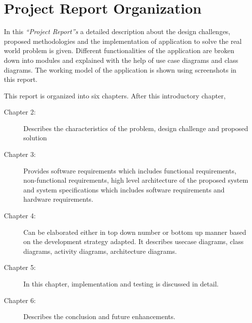 \documentclass[../Report.tex]{subfiles}
\begin{document}
\section{Project Report Organization}

In this \textit{``Project Report''s} a detailed description about the design challenges, proposed methodologies and the implementation of 
application to solve the real world problem is given. Different functionalities of the application are broken down into modules and 
explained with the help of use case diagrams and class diagrams. The working model of the application is shown using screenshots in this 
report.\par

\noindent
This report is organized into six chapters. After this introductory chapter,
\begin{description}
    \item [Chapter 2:] Describes the characteristics of the problem, design challenge and proposed solution
    
    \item [Chapter 3:] Provides software requirements which includes functional requirements, non-functional requirements, 
    high level architecture of the proposed system and system specifications which includes software requirements and hardware requirements.
    
    \item [Chapter 4:] Can be elaborated either in top down number or bottom up manner based on the development strategy adapted. 
    It describes usecase diagrams, class diagrams, activity diagrams, architecture diagrams.
    
    \item [Chapter 5:] In this chapter, implementation and testing is discussed in detail.
    
    \item [Chapter 6:] Describes the conclusion and future enhancements.
\end{description}
\end{document}
